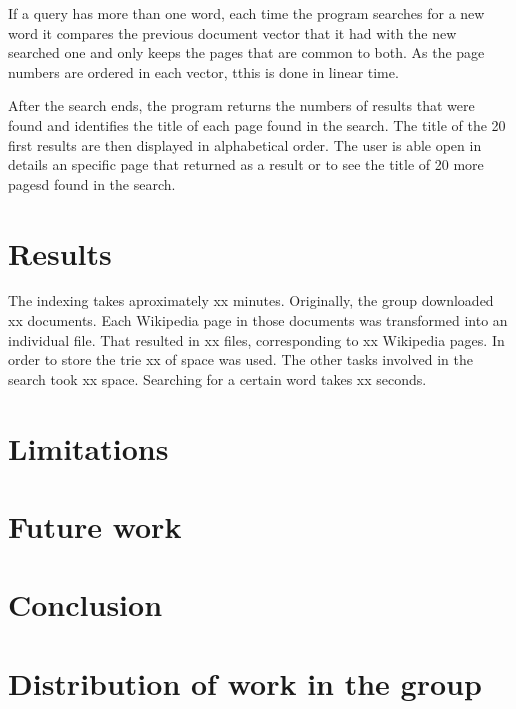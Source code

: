 \documentclass{article}
\begin{document}
If a query has more than one word, each time the program searches for a new word it compares the previous document vector that it had with the new searched one and only keeps the pages that are common to both. As the page numbers are ordered in each vector, tthis is done in linear time. 

After the search ends, the program returns the numbers of results that were found and identifies the title of each page found in the search. The title of the 20 first results are then displayed in alphabetical order. The user is able open in details an specific page that returned as a result or to see the title of 20 more pagesd found in the search. 


\section*{Results}
The indexing takes aproximately xx minutes. Originally, the group downloaded xx documents. Each Wikipedia page in those documents was transformed into an individual file. That resulted in xx files, corresponding to xx Wikipedia pages. In order to store the trie xx of space was used. The other tasks involved in the search took xx space. Searching for a certain word takes xx seconds. 

\section*{Limitations}

\section*{Future work}

\section*{Conclusion}

\section*{Distribution of work in the group}
\end{document}
